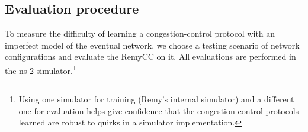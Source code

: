 \begin{comment}
In our measurements, we found that each of these congestion signals
independently brought value to a congestion-control protocol. No
three-signal subset was as strong as using all four signals. The most
valuable signal---by which we mean the signal whose removal cause the
greatest harm to the ultimate performance---was the
\texttt{rec\_ewma}. This suggests that these protocols may gain
considerable value from understanding the short-term packet-arrival
dynamics at the receiver.

\subsection{The congestion response}

The action uses a window-based congestion-control protocol that
caps the number of packets in flight, with pacing to regulate the rate
at which an end host meters packets into the network. The action for
any value of the memory is a triplet that specifies:
\begin{enumerate}
\item A multiplier $m$ to the current value of the congestion window.
\item An increment $b$ to the current value of the congestion window.
\item A lower bound $\tau$ on the pacing interval between outgoing packet transmissions.
\end{enumerate}

To emphasize that the resulting protocol is a brute-force
approximation of the best algorithm for a given set of training
scenarios and objective function, we refer to such protocols as
``tractable attempts at optimal'' congestion control, or Tao
protocols.

\end{comment}

\subsection{Evaluation procedure}
\label{ss:eval}
To measure the difficulty of learning a congestion-control protocol
with an imperfect model of the eventual network, we choose a testing
scenario of network configurations and evaluate the RemyCC on it. All
evaluations are performed in the ns-2 simulator.\footnote{Using one
  simulator for training (Remy's internal simulator) and a different
  one for evaluation helps give confidence that the congestion-control
  protocols learned are robust to quirks in a simulator
  implementation.}

